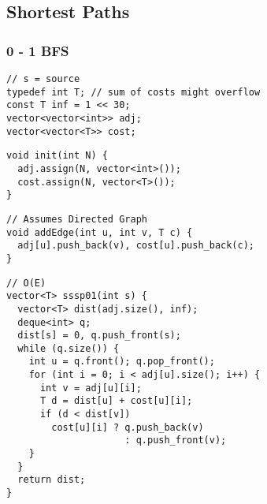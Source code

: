 \documentclass[twoside]{article}
\newcommand{\fileTitleStyle}{\large\underline}
\begin{document}
\begin{multicols*}{2}
\subsectionfont{\centering\bfseries\LARGE}
\vspace{0em}
\subsection*{Shortest Paths}
\vspace{2em}
\subsubsectionfont{\centering\bfseries\Large}
\subsubsectionfont{\fileTitleStyle}
\subsubsection*{0 - 1 BFS}
\begin{verbatim}
// s = source
typedef int T; // sum of costs might overflow
const T inf = 1 << 30;
vector<vector<int>> adj;
vector<vector<T>> cost;
\end{verbatim}
\vspace{-12pt}
\begin{verbatim}
void init(int N) {
  adj.assign(N, vector<int>());
  cost.assign(N, vector<T>());
}
\end{verbatim}
\vspace{-12pt}
\begin{verbatim}
// Assumes Directed Graph
void addEdge(int u, int v, T c) {
  adj[u].push_back(v), cost[u].push_back(c);
}
\end{verbatim}
\vspace{-12pt}
\begin{verbatim}
// O(E)
vector<T> sssp01(int s) {
  vector<T> dist(adj.size(), inf);
  deque<int> q;
  dist[s] = 0, q.push_front(s);
  while (q.size()) {
    int u = q.front(); q.pop_front();
    for (int i = 0; i < adj[u].size(); i++) {
      int v = adj[u][i];
      T d = dist[u] + cost[u][i];
      if (d < dist[v])
        cost[u][i] ? q.push_back(v)
                     : q.push_front(v);
    }
  }
  return dist;
}
\end{verbatim}

\subsubsectionfont{\centering\bfseries\Large}
\subsubsectionfont{\fileTitleStyle}

\end{multicols*}
\end{document}
